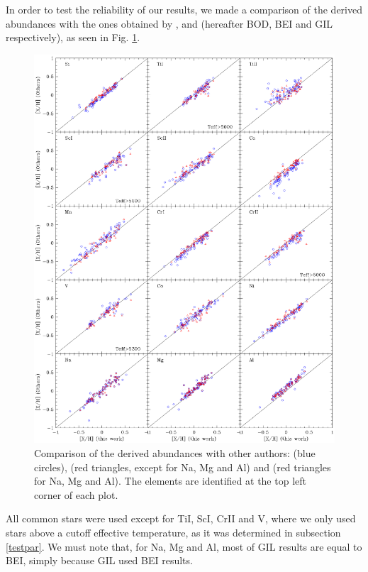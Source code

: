 \documentclass[dvips,12pt,a4paper]{report}
\begin{document}
{{In order to test the reliability of our results, we made a comparison of the derived abundances with the ones obtained by \citet{Bodaghee-2003}, \citet{Beirao-2005} and \citet{Gilli-2006} (hereafter BOD, BEI and GIL respectively), as seen in Fig. \ref{gfxcomparison}.

\begin{figure}[h!]
\centering
\includegraphics[trim=0cm 1.5cm 0cm 1cm,clip,width=16 cm]{pics/parte4/comp.eps}
\caption[Comparison of abundances with other authors]{Comparison of the derived abundances with other authors: \citet{Gilli-2006} (blue circles), \citet{Bodaghee-2003} (red triangles, except for Na, Mg and Al) and \citet{Beirao-2005} (red triangles for Na, Mg and Al). The elements are identified at the top left corner of each plot.}
\label{gfxcomparison}
\end{figure}

All common stars were used except for TiI, ScI, CrII and V, where we only used stars above a cutoff effective temperature, as it was determined in subsection \ref{testpar}. We must note that, for Na, Mg and Al, most of GIL results are equal to BEI, simply because GIL used BEI results.





}}
\end{document}
